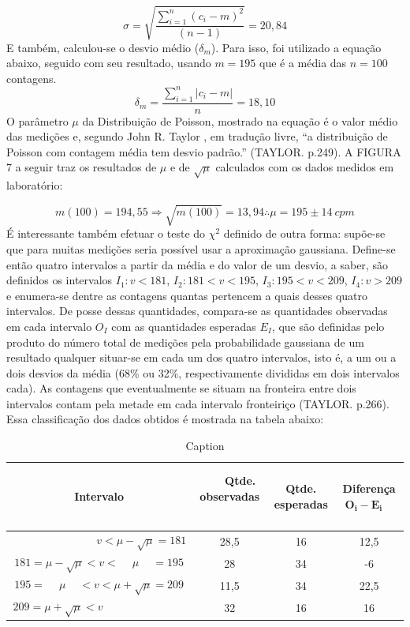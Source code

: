 \documentclass{article}
\begin{document}
\begin{equation}
	\label{desvio_padrao}
    \sigma = \sqrt{\frac{\sum _{i=1} ^{n} (c_i -m)^2}{(n-1)}} = 20,84
\end{equation}
E também, calculou-se o desvio médio ($\delta _m$). Para isso, foi utilizado a equação abaixo, seguido com seu resultado, usando $m =195$ que é a média das $n=100$ contagens.
\begin{equation}
	\delta _m = \frac{\sum _{i=1} ^{n} |c _i - m|}{n} = 18,10
\end{equation}
O parâmetro $\mu$ da Distribuição de Poisson, mostrado na equação  é o valor médio das medições e, segundo John R. Taylor , em tradução livre, “a distribuição de Poisson com contagem média tem desvio padrão.” (TAYLOR. p.249)\cite{taylor}. A FIGURA 7 a seguir traz os resultados de $\mu$ e de $\sqrt{\mu}$ calculados com os dados medidos em laboratório:

\begin{equation}
	m(100) = 194,55 \Rightarrow \sqrt{m(100)} = 13,94 \therefore \mu = 195 \pm 14 \ cpm
\end{equation}
É interessante também efetuar o teste do $\chi ^2$ definido de outra forma: supõe-se que para muitas medições seria possível usar a aproximação gaussiana. Define-se então quatro intervalos a partir da média e do valor de um desvio, a saber, são definidos os intervalos $I_1: v < 181$, $I_2 : 181 < v < 195$, $I _3 : 195 < v < 209$, $I_4 : v > 209$ e enumera-se dentre as contagens quantas pertencem a quais desses quatro intervalos. De posse dessas quantidades, compara-se as quantidades observadas em cada intervalo $O_I$ com as quantidades esperadas $E_I$, que são definidas pelo produto do número total de medições pela probabilidade gaussiana de um resultado qualquer situar-se em cada um dos quatro intervalos, isto é, a um ou a dois desvios da média (68\% ou 32\%, respectivamente divididas em dois intervalos cada). As contagens que eventualmente se situam na fronteira entre dois intervalos contam pela metade em cada intervalo fronteiriço (TAYLOR. p.266)\cite{taylor}. Essa classificação dos dados obtidos é mostrada na tabela abaixo:

\begin{table}[hb!]
    \centering
    \begin{tabular}{|c|c|c|c|}
    \hline
    \rowcolor{cinzaclaro}
\textbf{Intervalo} & ~ ~ \textbf{Qtde. observadas} ~ ~   & \textbf{Qtde. esperadas}  & ~ ~ \textbf{Diferença $\mathbf{O _i - E _i}$} ~ ~  \\ \hline
$\qquad \qquad \qquad \quad \ \ \ v < \mu - \sqrt{\mu} = 181 $     & 28,5         & 16    & 12,5         \\ \hline
$181 =\mu - \sqrt{\mu} < v < \ \quad \mu \ \quad = 195$     & 28         & 34     & -6         \\ \hline
$195 =  \ \quad \mu \quad \  < v < \mu + \sqrt{\mu} =209$     & 11,5         & 34     & 22,5         \\ \hline
$209 = \mu + \sqrt{\mu} < v \ \ \quad \qquad \qquad \qquad $      & 32          & 16     & 16         \\ \hline
    \end{tabular}
    \caption{Caption}
    \label{tabelachi2}
\end{table}
\end{document}
